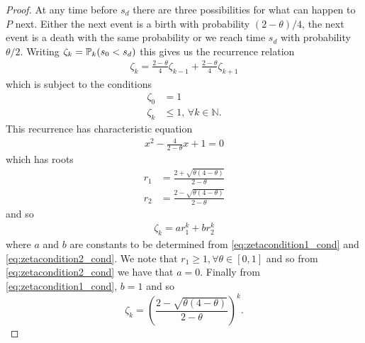 \begin{proof}
		 At any time before $s_d$ there are three possibilities for what can happen to $P$ next. Either the next event is a birth with probability $(2 - \theta)/4$, the next event is a death with the same probability or we reach time $s_d$ with probability $\theta/2$. Writing $\zeta_k = \mathbb{P}_k(s_0 < s_d)$ this gives us the recurrence relation
		 \begin{align}
		 	\zeta_k = \frac{2 - \theta}{4} \zeta_{k-1} + \frac{2 - \theta}{4} \zeta_{k+1}
		 \end{align}
		 which is subject to the conditions 
		 \begin{align}
		 	\label{eq:zetacondition1_cond}
		 	\zeta_0 &= 1\\
		 	\zeta_k &\leq 1, \, \forall k \in \mathbb{N}.
		 	\label{eq:zetacondition2_cond}
		 \end{align} 
		 This recurrence has characteristic equation
		 \begin{align}
		 	x^2 - \frac{4}{2 - \theta} x + 1 = 0
		 \end{align}
		 which has roots
		 \begin{align}
		 	r_1 &= \frac{2 + \sqrt{\theta(4 - \theta)}}{2 - \theta}\\
		 	r_2 &= \frac{2 - \sqrt{\theta(4 - \theta)}}{2 - \theta}
		 \end{align}
		 and so
		 \begin{align}
		 	\zeta_k = a r_1^k + b r_2^k
		 \end{align}
		 where $a$ and $b$ are constants to be determined from \eqref{eq:zetacondition1_cond} and \eqref{eq:zetacondition2_cond}. We note that $r_1 \geq 1, \forall \theta \in [0,1]$ and so from \eqref{eq:zetacondition2_cond} we have that $a = 0$. Finally from \eqref{eq:zetacondition1_cond}, $b = 1$ and so
		 \begin{equation}
		 	\zeta_k = \left(\frac{2 - \sqrt{\theta(4 - \theta)}}{2 - \theta}\right)^k.
		 \end{equation}
	\end{proof}